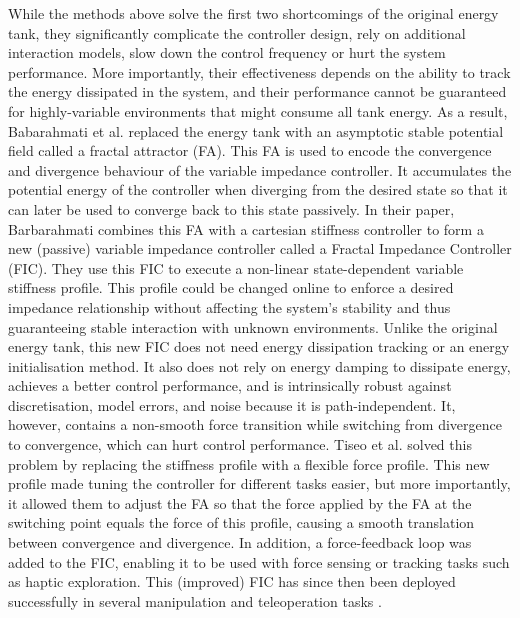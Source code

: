 While the methods above solve the first two shortcomings of the original energy tank, they significantly complicate the controller design, rely on additional interaction models, slow down the control frequency or hurt the system performance. More importantly, their effectiveness depends on the ability to track the energy dissipated in the system, and their performance cannot be guaranteed for highly-variable environments that might consume all tank energy. As a result, Babarahmati et al. \cite{babarahmatiFractalImpedancePassive2021} replaced the energy tank with an asymptotic stable potential field called a fractal attractor (FA). This FA is used to encode the convergence and divergence behaviour of the variable impedance controller. It accumulates the potential energy of the controller when diverging from the desired state so that it can later be used to converge back to this state passively. In their paper, Barbarahmati combines this FA with a cartesian stiffness controller to form a new (passive) variable impedance controller called a Fractal Impedance Controller (FIC). They use this FIC to execute a non-linear state-dependent variable stiffness profile. This profile could be changed online to enforce a desired impedance relationship without affecting the system's stability and thus guaranteeing stable interaction with unknown environments. Unlike the original energy tank, this new FIC does not need energy dissipation tracking or an energy initialisation method. It also does not rely on energy damping to dissipate energy, achieves a better control performance, and is intrinsically robust against discretisation, model errors, and noise because it is path-independent. It, however, contains a non-smooth force transition while switching from divergence to convergence, which can hurt control performance. Tiseo et al. solved this problem by replacing the stiffness profile with a flexible force profile. This new profile made tuning the controller for different tasks easier, but more importantly, it allowed them to adjust the FA so that the force applied by the FA at the switching point equals the force of this profile, causing a smooth translation between convergence and divergence. In addition, a force-feedback loop was added to the FIC, enabling it to be used with force sensing or tracking tasks such as haptic exploration. This (improved) FIC has since then been deployed successfully in several manipulation and teleoperation tasks \cite{tiseoRobustImpedanceControl2022,tiseoFineManipulationDynamic2022,tiseoAchievingDexterousBidirectional2022,tiseoGeometricalPosturalOptimisation2022,babarahmatiRobustHighTransparencyHaptic2021,tiseoSafeCompliantControl2020}.

